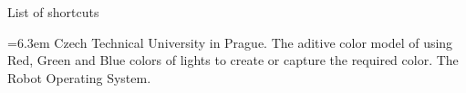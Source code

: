 \app List of shortcuts

\medskip
\bgroup \leftskip=6.3em
\abbrv[CTU]  Czech Technical University in Prague.
\abbrv[RGB]  The aditive color model of using Red, Green and Blue colors of lights to create or capture the required color.
\abbrv[ROS]  The Robot Operating System.
\par\egroup
